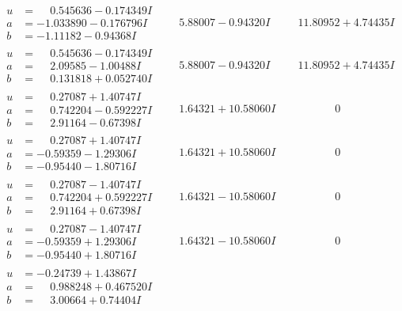 \documentclass[1p]{elsarticle_modified}
\theoremstyle{definition}
\begin{document}
$$\begin{array}{c|c|c}
\begin{aligned}
u &= \phantom{-}0.545636 - 0.174349 I \\
a &= -1.033890 - 0.176796 I \\
b &= -1.11182 - 0.94368 I\end{aligned}
 & \phantom{-}5.88007 - 0.94320 I & \phantom{-}11.80952 + 4.74435 I \\ \hline\begin{aligned}
u &= \phantom{-}0.545636 - 0.174349 I \\
a &= \phantom{-}2.09585 - 1.00488 I \\
b &= \phantom{-}0.131818 + 0.052740 I\end{aligned}
 & \phantom{-}5.88007 - 0.94320 I & \phantom{-}11.80952 + 4.74435 I \\ \hline\begin{aligned}
u &= \phantom{-}0.27087 + 1.40747 I \\
a &= \phantom{-}0.742204 - 0.592227 I \\
b &= \phantom{-}2.91164 - 0.67398 I\end{aligned}
 & \phantom{-}1.64321 + 10.58060 I & \phantom{-0.000000 } 0 \\ \hline\begin{aligned}
u &= \phantom{-}0.27087 + 1.40747 I \\
a &= -0.59359 - 1.29306 I \\
b &= -0.95440 - 1.80716 I\end{aligned}
 & \phantom{-}1.64321 + 10.58060 I & \phantom{-0.000000 } 0 \\ \hline\begin{aligned}
u &= \phantom{-}0.27087 - 1.40747 I \\
a &= \phantom{-}0.742204 + 0.592227 I \\
b &= \phantom{-}2.91164 + 0.67398 I\end{aligned}
 & \phantom{-}1.64321 - 10.58060 I & \phantom{-0.000000 } 0 \\ \hline\begin{aligned}
u &= \phantom{-}0.27087 - 1.40747 I \\
a &= -0.59359 + 1.29306 I \\
b &= -0.95440 + 1.80716 I\end{aligned}
 & \phantom{-}1.64321 - 10.58060 I & \phantom{-0.000000 } 0 \\ \hline\begin{aligned}
u &= -0.24739 + 1.43867 I \\
a &= \phantom{-}0.988248 + 0.467520 I \\
b &= \phantom{-}3.00664 + 0.74404 I\end{aligned}

\end{array}$$
\end{document}
